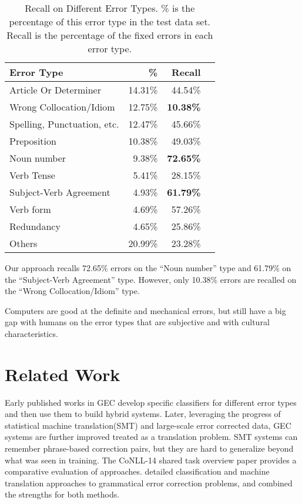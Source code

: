 \documentclass[11pt,a4paper]{article}
\begin{document}
\begin{table}[t!]
\begin{center}
\begin{tabular}{|l|r|r|r|}
\hline \bf Error Type & \bf \% & \bf Recall \\ \hline
Article Or Determiner & 14.31\% & 44.54\% \\
Wrong Collocation/Idiom & 12.75\% & \bf{10.38\%} \\
Spelling, Punctuation, etc. & 12.47\% & 45.66\% \\
Preposition & 10.38\% & 49.03\% \\
Noun number & 9.38\% & \bf{72.65\%} \\
Verb Tense & 5.41\% & 28.15\% \\
Subject-Verb Agreement & 4.93\% & \bf{61.79\%} \\
Verb form & 4.69\% & 57.26\% \\
Redundancy & 4.65\% & 25.86\% \\ \hline

Others & 20.99\% & 23.28\% \\
\hline
\end{tabular}
\end{center}
\caption{\label{error_type} Recall on Different Error Types. \% is the percentage of this error type in the test data set. Recall is the percentage of the fixed errors in each error type.}
\end{table}


Our approach recalls 72.65\% errors on the ``Noun number'' type and 61.79\% on the ``Subject-Verb Agreement'' type. However, only 10.38\% errors are recalled on the ``Wrong Collocation/Idiom'' type. 

Computers are good at the definite and mechanical errors, but still have a big gap with humans on the error types that are subjective and with cultural characteristics.


\section{Related Work}

Early published works in GEC develop specific classifiers for different error types and then use them to build hybrid systems. 
Later, leveraging the progress of statistical machine translation(SMT) and large-scale error corrected data, GEC systems are further improved treated as a translation problem. SMT systems can remember phrase-based correction pairs, but they are hard to generalize beyond what was seen in training. The CoNLL-14 shared task overview paper \cite{ng2014conll} provides a comparative evaluation of approaches. \cite{rozovskaya2016grammatical} detailed classification and machine translation approaches to grammatical error correction problems, and combined the strengths for both methods.
\end{document}
